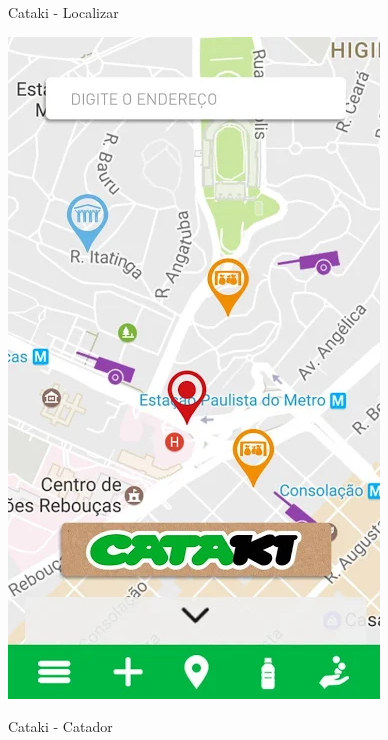 \documentclass[
	12pt,				%
	openright,			%
	twoside,			%
	a4paper,			%
	english,			%
	french,				%
	spanish,			%
	brazil				%
	]{abntex2}
\begin{document}
    \begin{figure}[htb]    
 \centering
  \begin{minipage}{0.45\textwidth}
    \centering
    \caption{Cataki - Localizar}
    \includegraphics[scale=0.45]{media/catakimap.png}
     \label{fig:figura1}
  \end{minipage}
  \hfill
  \begin{minipage}{0.45\textwidth}
    \centering
    \caption{Cataki - Catador}

\end{minipage}
\end{figure}
\end{document}
